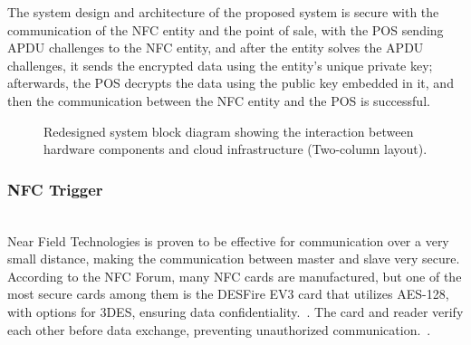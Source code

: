 \documentclass[sigconf, nonacm]{acmart}
\begin{document}
The system design and architecture of the proposed system is secure with the communication of the NFC entity and the point of sale, with the POS sending APDU challenges to the NFC entity, and after the entity solves the APDU challenges, it sends the encrypted data using the entity’s unique private key; afterwards, the POS decrypts the data using the public key embedded in it, and then the communication between the NFC entity and the POS is successful. 


\begin{figure}[t]
  \centering
  \caption{Redesigned system block diagram showing the interaction between hardware components and cloud infrastructure (Two-column layout).}
  \label{fig:system_block}
\end{figure}

\subsubsection{NFC Trigger} \mbox{} \\

Near Field Technologies is proven to be effective for communication over a very small distance, making the communication between master and slave very secure. According to the NFC Forum, many NFC cards are manufactured, but one of the most secure cards among them is the DESFire EV3 card that utilizes AES-128, with options for 3DES, ensuring data confidentiality.~\cite{mifaredesfireev3}. The card and reader verify each other before data exchange, preventing unauthorized communication.~\cite{hidmifare}. 
\end{document}
